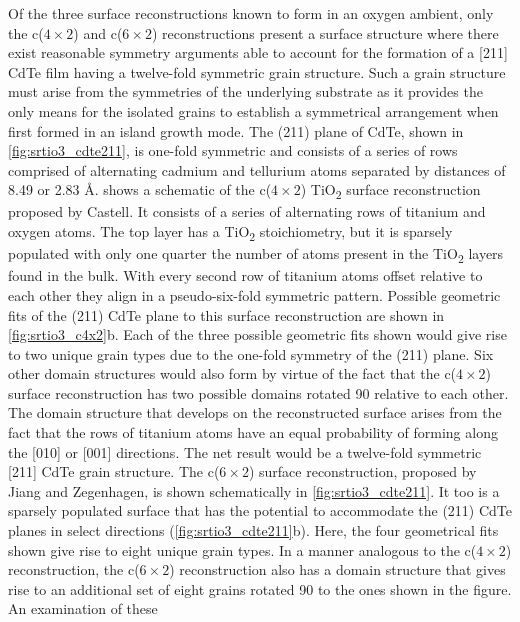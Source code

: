 Of the three surface reconstructions known to form in an
oxygen ambient, only the c(\(4\times2\)) and c(\(6\times2\)) reconstructions
present a surface structure where there exist reasonable symmetry
arguments able to account for the formation of a [211] CdTe film
having a twelve-fold symmetric grain structure. Such a grain
structure must arise from the symmetries of the underlying
substrate as it provides the only means for the isolated grains to
establish a symmetrical arrangement when first formed in an
island growth mode. The (211) plane of CdTe, shown in \cref{fig:srtio3_cdte211}, is
one-fold symmetric and consists of a series of rows comprised of
alternating cadmium and tellurium atoms separated by distances of 8.49 or 2.83 \AA.  shows a schematic of the c(\(4\times2\)) TiO\textsubscript{2} surface reconstruction proposed by Castell\cite{Castell2002}. It consists of a
series of alternating rows of titanium and oxygen atoms. The top
layer has a TiO\textsubscript{2} stoichiometry, but it is sparsely populated with
only one quarter the number of atoms present in the TiO\textsubscript{2} layers
found in the bulk\cite{Castell2002}. With every second row of titanium atoms
offset relative to each other they align in a pseudo-six-fold
symmetric pattern. Possible geometric fits of the (211) CdTe plane
to this surface reconstruction are shown in \cref{fig:srtio3_c4x2}b. Each of the three
possible geometric fits shown would give rise to two unique grain
types due to the one-fold symmetry of the (211) plane. Six other
domain structures would also form by virtue of the fact that the
c(\(4\times2\)) surface reconstruction has two possible domains rotated
90\degree{} relative to each other\cite{Castell2002}. The domain structure that develops
on the reconstructed surface arises from the fact that the rows of
titanium atoms have an equal probability of forming along the
[010] or [001] directions. The net result would be a twelve-fold
symmetric [211] CdTe grain structure. The c(\(6\times2\)) surface
reconstruction, proposed by Jiang and Zegenhagen\cite{Jiang1996}, is shown
schematically in \cref{fig:srtio3_cdte211}. It too is a sparsely populated surface that
has the potential to accommodate the (211) CdTe planes in select
directions (\cref{fig:srtio3_cdte211}b). Here, the four geometrical fits shown give rise
to eight unique grain types. In a manner analogous to the c(\(4\times2\))
reconstruction, the c(\(6\times2\)) reconstruction also has a domain
structure that gives rise to an additional set of eight grains rotated
90\degree{} to the ones shown in the figure. An examination of these
